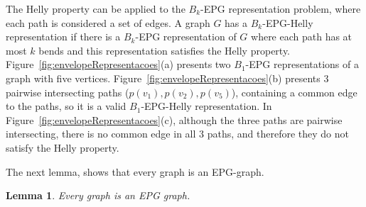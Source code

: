 \documentclass[preprint,12pt]{elsarticle} %
\newtheorem{lema}[theorem]{Lemma}
\begin{document}
The Helly property can be applied to the $ B_k $-EPG representation problem, where each path is considered a set of edges. A graph $ G $ has a  $ B_k$-EPG-Helly representation if there is a $ B_k $-EPG representation of $G$ where each path has at most $ k $ bends and this representation satisfies the Helly property. %
 Figure~\ref{fig:envelopeRepresentacoes}(a) presents two $B_1$-EPG representations of a graph with five vertices.  Figure~\ref{fig:envelopeRepresentacoes}(b)   presents 3 pairwise intersecting paths ($p(v_1), p(v_2), p(v_5)$), containing a common edge to the paths, so it is a valid $ B_1$-EPG-Helly representation. In Figure~\ref{fig:envelopeRepresentacoes}(c), although the three paths are pairwise intersecting, there is no common edge in all 3 paths, and therefore they do not satisfy the Helly property. 





 The next lemma, shows that every graph is an EPG-graph.
 
 \begin{lema} \citep{golumbic2009} \label{lem:todoGrafoEpg}
 Every graph is an EPG graph.
 \end{lema}
 
 
\end{document}
